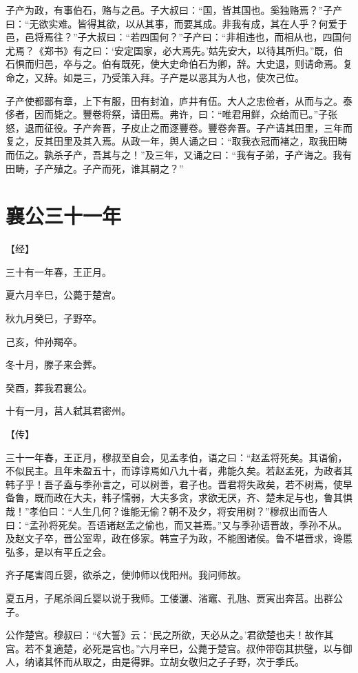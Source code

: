 \documentclass[a4paper,12pt,UTF8,twoside]{ctexbook}
\begin{document}
子产为政，有事伯石，赂与之邑。子大叔曰：“国，皆其国也。奚独赂焉？”子产曰：“无欲实难。皆得其欲，以从其事，而要其成。非我有成，其在人乎？何爱于邑，邑将焉往？”子大叔曰：“若四国何？”子产曰：“非相违也，而相从也，四国何尤焉？《郑书》有之曰：‘安定国家，必大焉先。’姑先安大，以待其所归。”既，伯石惧而归邑，卒与之。伯有既死，使大史命伯石为卿，辞。大史退，则请命焉。复命之，又辞。如是三，乃受策入拜。子产是以恶其为人也，使次己位。

子产使都鄙有章，上下有服，田有封洫，庐井有伍。大人之忠俭者，从而与之。泰侈者，因而毙之。豐卷将祭，请田焉。弗许，曰：“唯君用鲜，众给而已。”子张怒，退而征役。子产奔晋，子皮止之而逐豐卷。豐卷奔晋。子产请其田里，三年而复之，反其田里及其入焉。从政一年，舆人诵之曰：“取我衣冠而褚之，取我田畴而伍之。孰杀子产，吾其与之！”及三年，又诵之曰：“我有子弟，子产诲之。我有田畴，子产殖之。子产而死，谁其嗣之？”

\chapter{襄公三十一年}



【经】

三十有一年春，王正月。

夏六月辛巳，公薨于楚宫。

秋九月癸巳，子野卒。

己亥，仲孙羯卒。

冬十月，滕子来会葬。

癸酉，葬我君襄公。

十有一月，莒人弑其君密州。

【传】

三十一年春，王正月，穆叔至自会，见孟孝伯，语之曰：“赵孟将死矣。其语偷，不似民主。且年未盈五十，而谆谆焉如八九十者，弗能久矣。若赵孟死，为政者其韩子乎！吾子盍与季孙言之，可以树善，君子也。晋君将失政矣，若不树焉，使早备鲁，既而政在大夫，韩子懦弱，大夫多贪，求欲无厌，齐、楚未足与也，鲁其惧哉！”孝伯曰：“人生几何？谁能无偷？朝不及夕，将安用树？”穆叔出而告人曰：“孟孙将死矣。吾语诸赵孟之偷也，而又甚焉。”又与季孙语晋故，季孙不从。及赵文子卒，晋公室卑，政在侈家。韩宣子为政，不能图诸侯。鲁不堪晋求，谗慝弘多，是以有平丘之会。

齐子尾害闾丘婴，欲杀之，使帅师以伐阳州。我问师故。

夏五月，子尾杀闾丘婴以说于我师。工偻灑、渻竈、孔虺、贾寅出奔莒。出群公子。

公作楚宫。穆叔曰：“《大誓》云：‘民之所欲，天必从之。’君欲楚也夫！故作其宫。若不复適楚，必死是宫也。”六月辛巳，公薨于楚宫。叔仲带窃其拱璧，以与御人，纳诸其怀而从取之，由是得罪。立胡女敬归之子子野，次于季氏。
\end{document}
